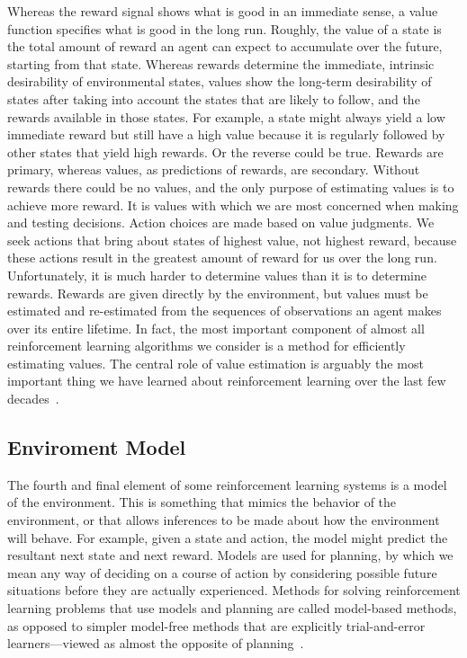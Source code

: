 \documentclass[letterpaper, 10 pt]{IEEEconf}
\begin{document}
Whereas the reward signal shows what is good in an immediate sense, a
value function specifies what is good in the long run. Roughly, the
value of a state is the total amount of reward an agent can expect to
accumulate over the future, starting from that state. Whereas rewards
determine the immediate, intrinsic desirability of environmental
states, values show the long-term desirability of states after taking
into account the states that are likely to follow, and the rewards
available in those states. For example, a state might always yield a
low immediate reward but still have a high value because it is
regularly followed by other states that yield high rewards. Or the
reverse could be true.  Rewards are primary, whereas values, as
predictions of rewards, are secondary. Without rewards there could be
no values, and the only purpose of estimating values is to achieve
more reward. It is values with which we are most concerned when making
and testing decisions. Action choices are made based on value
judgments. We seek actions that bring about states of highest value,
not highest reward, because these actions result in the greatest
amount of reward for us over the long run. Unfortunately, it is much
harder to determine values than it is to determine rewards. Rewards
are given directly by the environment, but values must be estimated
and re-estimated from the sequences of observations an agent makes
over its entire lifetime. In fact, the most important component of
almost all reinforcement learning algorithms we consider is a method
for efficiently estimating values. The central role of value
estimation is arguably the most important thing we have learned about
reinforcement learning over the last few decades~\cite{sutton2018reinforcement}.

\subsection{Enviroment Model}

The fourth and final element of some reinforcement learning systems is
a model of the environment. This is something that mimics the behavior
of the environment, or that allows inferences to be made about how the
environment will behave. For example, given a state and action, the
model might predict the resultant next state and next reward. Models
are used for planning, by which we mean any way of deciding on a
course of action by considering possible future situations before they
are actually experienced. Methods for solving reinforcement learning
problems that use models and planning are called model-based methods,
as opposed to simpler model-free methods that are explicitly
trial-and-error learners—viewed as almost the opposite of planning~\cite{sutton2018reinforcement}.
\end{document}
